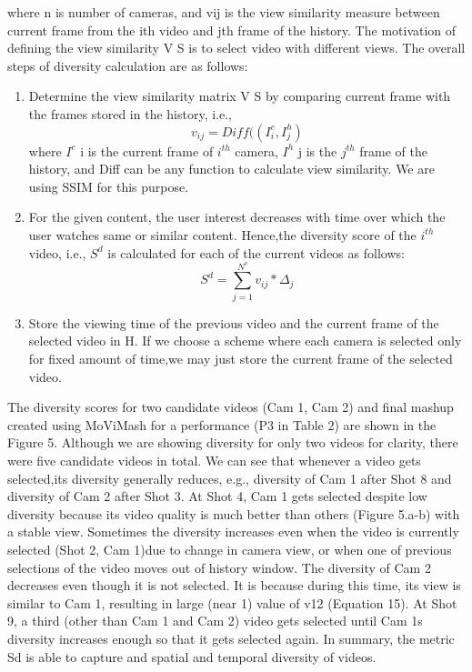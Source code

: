 \documentclass{IEEEtran}
\begin{document}
where n is number of cameras, and vij is the view similarity measure between current frame from the ith video and jth frame of the history. The motivation of defining the view similarity V S is to select video with different views. The overall steps of diversity calculation are as follows:
\begin{enumerate}
    \item Determine the view similarity matrix V S by comparing current frame with the frames stored in the history, i.e.,
    \[
     v_{ij} = Diff((I_i^c,I_j^h)
    \]
    where $I^c$ i is the current frame of $i^{th}$ camera, $I^h$ j is the $j^{th}$ frame of the history, and Diff can be any function to calculate view similarity. We are using SSIM \cite{web:17} for this purpose.
    \item For the given content, the user interest decreases with time over which the user watches same or similar content. Hence,the diversity score of the $i^{th}$ video, i.e., $S^d$ is calculated for each of the current videos as follows:
    \[
      S^d = \sum_{j=1}^{N^v}v_{ij}*\Delta_j
    \]
    \item Store the viewing time of the previous video and the current frame of the selected video in H. If we choose a scheme where each camera is selected only for fixed amount of time,we may just store the current frame of the selected video.
\end{enumerate}
The diversity scores for two candidate videos (Cam 1, Cam 2) and final mashup created using MoViMash for a performance (P3 in Table 2) are shown in the Figure 5. Although we are showing
diversity for only two videos for clarity, there were five candidate videos in total. We can see that whenever a video gets selected,its diversity generally reduces, e.g., diversity of Cam 1 after Shot 8 and diversity of Cam 2 after Shot 3. At Shot 4, Cam 1 gets selected despite low diversity because its video quality is much better than others (Figure 5.a-b) with a stable view. Sometimes the diversity increases even when the video is currently selected (Shot 2, Cam 1)due to change in camera view, or when one of previous selections of the video moves out of history window. The diversity of Cam 2 decreases even though it is not selected. It is because during this time, its view is similar to Cam 1, resulting in large (near 1) value of v12 (Equation 15). At Shot 9, a third (other than Cam 1 and Cam 2) video gets selected until Cam 1\textquotesingle s diversity increases enough so that it gets selected again. In summary, the metric Sd is able to
capture and spatial and temporal diversity of videos.
\end{document}
